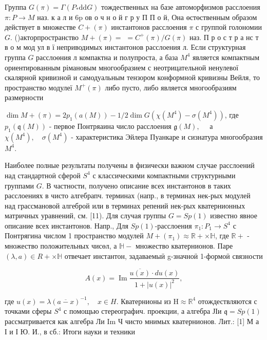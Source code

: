 \documentclass[10pt]{article}
\begin{document}
Группа $G(\pi)=\Gamma\left(P_{*} \mathrm{dd} G\right)$ тождественных на базе автоморфизмов расслоения $\pi: P \rightarrow M$ наз. к а л и $6 \mathrm{p}$ ов о ч н о й г р у П П о й, Она өстөственным образом действует в множестве $C+(\pi)$ инстантонов расслоения $\pi$ с группой голономии $G$. ()акторпространство $M+(\pi)=$ $=C^{+}(\pi) / G(\pi)$ наз. П р о с т р а нс т в о м мод ул в ї неприводимых инстантонов расслоения л. Если структурная группа $G$ расслоөния л компактна и полупроста, а база $M^{4}$ является компактным ориентированным рімановым многообразием с неотрицательной ненулевої скалярной кривизной и самодуальным тензором конформной кривизны Вейля, то пространство модулеї $M^{+}(\pi)$ либо пусто, либо является многообразиям размерности



$\operatorname{dim} M+(\pi)=2 p_{1}(a(M))-1 / 2 \operatorname{dim} G\left(\chi\left(M^{4}\right)-\sigma\left(M^{4}\right)\right)$, где $p_{1}(\mathfrak{q}(M))$ - первое Понтряаина число расслоения $\mathfrak{g}(M), \quad$ а $\chi\left(M^{4}\right), \quad \sigma\left(M^{4}\right)$ - характеристика Эйлера Пуанкаре и сизнатура многообразия $M^{4}$.



Наиболее полные результаты получены в физически важном случае расслоений над стандартноӥ сферой $S^{4}$ с классическими компактными структурными группами $G$. В частности, получено описание всех инстантонов в таких расслоениях в чисто алгебрапч. терминах (напр., в терминах нек-рых модулей над грассмановой алгеброй или в терминах репений нек-рых кватернионных матричных уравнений, см. [11). Для случая группы $G=S p(1)$ известно явное описание всех инстантонов. Напр., Для $S p(1)$-расслоения $\pi_{1}: P_{1} \rightarrow S^{4}$ с Понтрягина числом 1 пространство модулей $M+\left(\pi_{1}\right) \approx \mathbb{R}+\times \mathbb{H}$, где $\mathbb{R}+$ - множество положительных чисөл, а $\mathbb{H}-$ множество кватернионов. Паре $(\lambda, a) \in R+\times \mathbb{H}$ отвечает инстантон, задаваемыӥ g-значноӥ 1-формоӥ связности



\[

A(x)=\operatorname{Im} \frac{\overline{u(x)} \cdot d u(x)}{1+|u(x)|^{2}},

\]



где $u(x)=\lambda(\overline{a-x})^{-1}, \quad x \in H$. Кватернионы из $\mathrm{H} \approx \mathbb{R}^{4}$ отождествляются с точками сферы $S^{4}$ с помощью стереографич. проекции, а алгебра ЈІи $\mathfrak{q}=S p(1)$ рассматривается как алгебра Ли Im Ч чисто мнимых кватернионов. Лит.: [1] М а І и І Ю. И., в сб.: Итоги науки и техники
\end{document}
